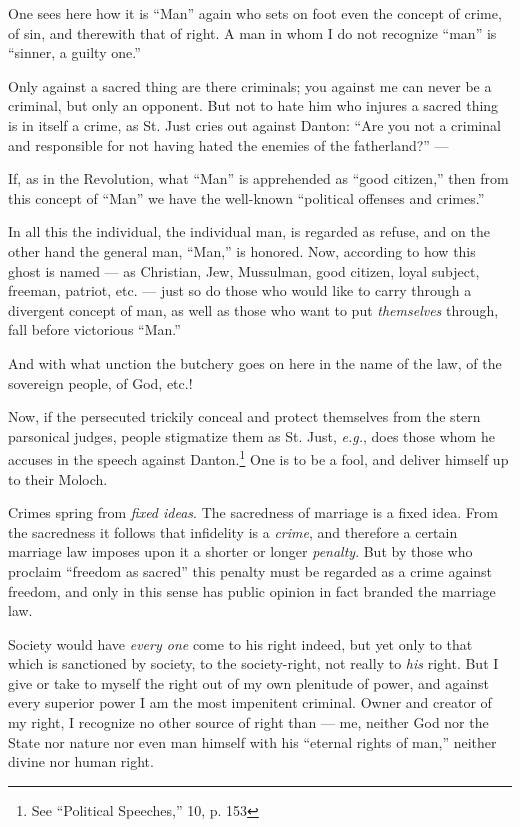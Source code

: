 One sees here how it is ``Man'' again who sets on foot even the concept of 
crime, of sin, and therewith that of right. A man in whom I do not recognize 
``man'' is ``sinner, a guilty one.''

Only against a sacred thing are there criminals; you against me can never be a 
criminal, but only an opponent. But not to hate him who injures a sacred thing 
is in itself a crime, as St. Just cries out against Danton: ``Are you not a 
criminal and responsible for not having hated the enemies of the 
fatherland?'' ---

If, as in the Revolution, what ``Man'' is apprehended as ``good citizen,'' 
then from this concept of ``Man'' we have the well-known ``political 
offenses and crimes.''

In all this the individual, the individual man, is regarded as refuse, and on 
the other hand the general man, ``Man,'' is honored. Now, according to how 
this ghost is named --- as Christian, Jew, Mussulman, good citizen, loyal 
subject, freeman, patriot, etc. --- just so do those who would like to carry 
through a divergent concept of man, as well as those who want to put 
\textit{themselves} through, fall before victorious ``Man.''

And with what unction the butchery goes on here in the name of the law, of the 
sovereign people, of God, etc.!

Now, if the persecuted trickily conceal and protect themselves from the stern 
parsonical judges, people stigmatize them as St. Just, \textit{e.g.}, does 
those whom he accuses in the speech against Danton.\footnote{See ``Political 
Speeches,'' 10, p. 153} One is to be a fool, and deliver himself up to their 
Moloch.

Crimes spring from \textit{fixed ideas}. The sacredness of marriage is a fixed 
idea. From the sacredness it follows that infidelity is a \textit{crime}, and 
therefore a certain marriage law imposes upon it a shorter or longer 
\textit{penalty}. But by those who proclaim ``freedom as sacred'' this 
penalty must be regarded as a crime against freedom, and only in this sense 
has public opinion in fact branded the marriage law.

Society would have \textit{every one} come to his right indeed, but yet only 
to that which is sanctioned by society, to the society-right, not really to 
\textit{his} right. But I give or take to myself the right out of my own 
plenitude of power, and against every superior power I am the most impenitent 
criminal. Owner and creator of my right, I recognize no other source of right 
than --- me, neither God nor the State nor nature nor even man himself with his 
``eternal rights of man,'' neither divine nor human right.

